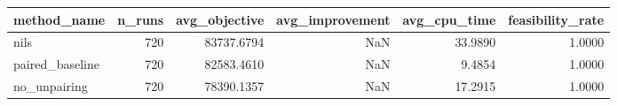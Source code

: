 \begin{tabular}{lrrrrr}
\toprule
method_name & n_runs & avg_objective & avg_improvement & avg_cpu_time & feasibility_rate \\
\midrule
nils & 720 & 83737.6794 & NaN & 33.9890 & 1.0000 \\
paired_baseline & 720 & 82583.4610 & NaN & 9.4854 & 1.0000 \\
no_unpairing & 720 & 78390.1357 & NaN & 17.2915 & 1.0000 \\
\bottomrule
\end{tabular}
